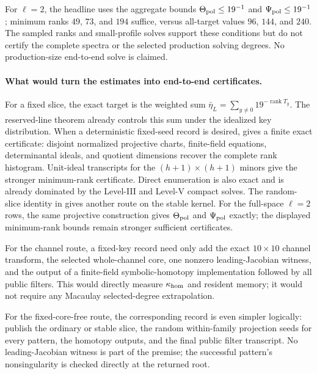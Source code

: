\documentclass[11pt]{article}
\newcommand{\rank}{\operatorname{rank}}
\begin{document}
For $\ell=2$, the headline uses the aggregate bounds
$\Theta_{\rm pol}\le19^{-1}$ and $\Psi_{\rm pol}\le19^{-1}$; minimum ranks
$49$, $73$, and $194$ suffice, versus all-target values $96$, $144$, and
$240$.  The sampled ranks and small-profile solves support these conditions but
do not certify the complete spectra or the selected production solving
degrees.  No production-size end-to-end solve is claimed.

\paragraph{What would turn the estimates into end-to-end certificates.}
For a fixed slice, the exact target is the weighted sum
$\bar\eta_L=\sum_{y\ne0}19^{-\rank T_y}$.  The reserved-line theorem already
controls this sum under the idealized key distribution.  When a deterministic fixed-seed record
is desired,  gives a finite exact
certificate: disjoint normalized projective charts, finite-field equations,
determinantal ideals, and quotient dimensions recover the complete rank
histogram.  Unit-ideal transcripts for the $(h+1)\times(h+1)$ minors give the
stronger minimum-rank certificate.  Direct enumeration is also exact and is
already dominated by the Level-III and Level-V compact solves.  The
random-slice identity in  gives another route on the
stable kernel.  For
the full-space $\ell=2$ rows, the same projective construction gives
$\Theta_{\rm pol}$ and $\Psi_{\rm pol}$ exactly; the displayed
minimum-rank bounds remain stronger sufficient certificates.

For the channel route, a fixed-key record need only add the exact
$10\times10$ channel transform, the selected whole-channel core, one nonzero
leading-Jacobian witness, and the output of a finite-field symbolic-homotopy
implementation followed by all public filters.  This would directly measure
$\kappa_{\rm hom}$ and resident memory; it would not require any Macaulay
selected-degree extrapolation.

For the fixed-core-free route, the corresponding record is even simpler
logically: publish the ordinary or stable slice, the random within-family
projection seeds for every pattern, the homotopy outputs, and the final public
filter transcript.  No leading-Jacobian witness is part of the premise; the
successful pattern's nonsingularity is checked directly at the returned root.
\end{document}
